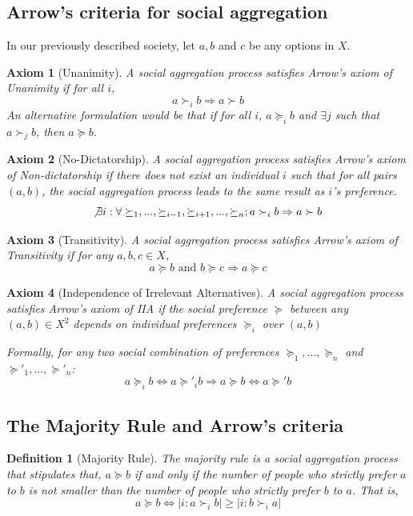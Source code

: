 \documentclass[12pt]{report}
\newtheorem{definition}{Definition}[chapter]
\newtheorem{axiom}{Axiom}[chapter]
\begin{document}
\subsection{Arrow's criteria for social aggregation} 

In our previously described society, let $a, b$ and $c$ be any options in $X$.

\begin{axiom}[Unanimity]
A social aggregation process satisfies Arrow's axiom of Unanimity if for all $i$, $$a \succ_i b \Rightarrow a \succ b$$ An alternative formulation would be that if for all $i$, $a \succeq_i b$ and $\exists j$ such that $a \succ_j b$, then $a \succeq b$.
\end{axiom}

\begin{axiom}[No-Dictatorship] 
A social aggregation process satisfies Arrow's axiom of Non-dictatorship if there does not exist an individual $i$ such that for all pairs $(a,b)$, the social aggregation process leads to the same result as $i$'s preference. 
$$\not\exists i: \forall \succeq_1,..., \succeq_{i-1},\succeq_{i+1},...,\succeq_n ; a \succ_i b \Rightarrow a \succ b $$
\end{axiom} 

\begin{axiom}[Transitivity]
A social aggregation process satisfies Arrow's axiom of Transitivity if for any $a,b,c\in X$, $$a \succeq b \text{ and } b \succeq c \Rightarrow a \succeq c$$
\end{axiom} 

\begin{axiom}[Independence of Irrelevant Alternatives] 
A social aggregation process satisfies Arrow's axiom of IIA if the social preference $\succeq$ between any $(a,b) \in X^2$ depends on individual preferences $\succeq_i$ over $(a,b)$

Formally, for any two social combination of preferences $\succeq_1,...,\succeq_n$ and $\succeq'_1,...,\succeq'_n$: $$ a \succeq_i b \Leftrightarrow a \succeq'_i b \Rightarrow a \succeq b \Leftrightarrow a \succeq' b $$
\end{axiom}

\subsection{The Majority Rule and Arrow's criteria} 

\begin{definition}[Majority Rule]
The majority rule is a social aggregation process that stipulates that, $a \succeq b$ if and only if the number of people who strictly prefer $a$ to $b$ is not smaller than the number of people who strictly prefer $b$ to $a$. That is, $$ a \succeq b \Leftrightarrow |{i:a\succ_i b}|\geq|{i:b\succ_i a}| $$
\end{definition}
\end{document}
